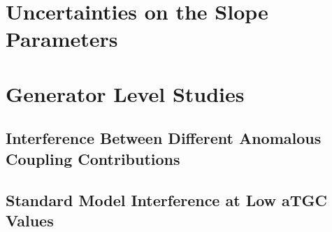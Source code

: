 \label{sec:NormalizationandShapeoftheaTGCContribution}
\section{Uncertainties on the Slope Parameters}
\section{Generator Level Studies}
\subsection{Interference Between Different Anomalous Coupling Contributions}
\subsection{Standard Model Interference at Low aTGC Values}
